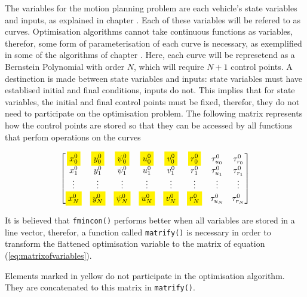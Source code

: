 \par The variables for the motion planning problem are each vehicle's state variables and inputs, as explained in chapter \label{chap:autonomousvehiclemodels}. Each of these variables will be refered to as curves. Optimisation algorithms cannot take continuous functions as variables, therefor, some form of parameterisation of each curve is necessary, as exemplified in some of the algorithms of chapter \label{chap:theory}. Here, each curve will be represetend as a Bernstein Polynomial with order $N$, which will require $N+1$ control points. A destinction is made between state variables and inputs: state variables must have establised initial and final conditions, inputs do not. This implies that for state variables, the initial and final control points must be fixed, therefor, they do not need to participate on the optimisation problem. The following matrix represents how the control points are stored so that they can be accessed by all functions that perfom operations on the curves

\begin{equation}
    \begin{bmatrix}
        \colorbox{yellow}{$\displaystyle x_0^0$} & \colorbox{yellow}{$\displaystyle y_0^0$} & \colorbox{yellow}{$\displaystyle \psi_0^0$} & \colorbox{yellow}{$\displaystyle u_0^0$} & \colorbox{yellow}{$\displaystyle v_0^0$} & \colorbox{yellow}{$\displaystyle r_0^0$} & \tau_{u_0}^0 & \tau_{r_0}^0 \\
        x_1^0 & y_1^0 & \psi_1^0 & u_1^0 & v_1^0 & r_1^0 & \tau_{u_1}^0 & \tau_{r_1}^0 \\
        \vdots & \vdots & \vdots & \vdots & \vdots & \vdots & \vdots & \vdots \\
        \colorbox{yellow}{$x_{N}^0$} & \colorbox{yellow}{$y_{N}^0$} & \colorbox{yellow}{$\psi_{N}^0$} & \colorbox{yellow}{$u_{N}^0$} & \colorbox{yellow}{$v_{N}^0$} & \colorbox{yellow}{$r_{N}^0$} & \tau_{u_{N}}^0 & \tau_{r_{N}}^0
    \end{bmatrix}
    \label{eq:matrixofvariables}
\end{equation}

\par It is believed  that \texttt{fmincon()} performs better when all variables are stored in a line vector, therefor, a function called \texttt{matrify()} is necessary in order to transform the flattened optimisation variable to the matrix of equation (\ref{eq:matrixofvariables}). 
\par Elements marked in yellow do not participate in the optimisation algorithm. They are concatenated to this matrix in \texttt{matrify()}. 


